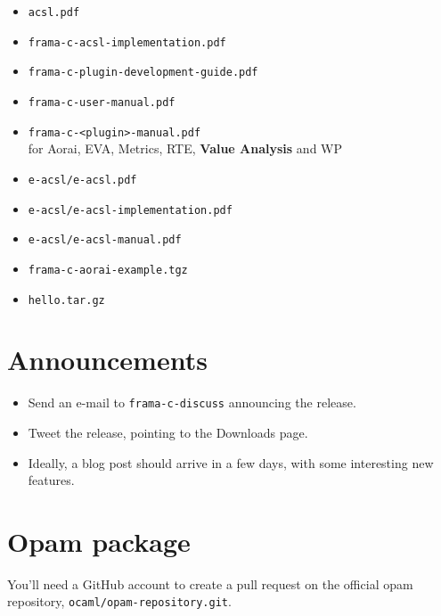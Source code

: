 \begin{itemize}
  \item \texttt{acsl.pdf}
  \item \texttt{frama-c-acsl-implementation.pdf}
  \item \texttt{frama-c-plugin-development-guide.pdf}
  \item \texttt{frama-c-user-manual.pdf}
  \item \texttt{frama-c-<plugin>-manual.pdf}\\
        for Aorai, EVA, Metrics, RTE, \textbf{Value Analysis} and WP
  \item \texttt{e-acsl/e-acsl.pdf}
  \item \texttt{e-acsl/e-acsl-implementation.pdf}
  \item \texttt{e-acsl/e-acsl-manual.pdf}
  \item \texttt{frama-c-aorai-example.tgz}
  \item \texttt{hello.tar.gz}
\end{itemize}

\section{Announcements}

\begin{itemize}
\item Send an e-mail to \texttt{frama-c-discuss} announcing the release.
\item Tweet the release, pointing to the Downloads page.
\item Ideally, a blog post should arrive in a few days, with some interesting
  new features.
\end{itemize}

\section{Opam package}

You'll need a GitHub account to create a pull request on the official opam repository,
\texttt{ocaml/opam-repository.git}.

